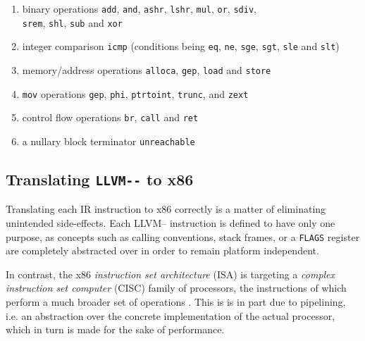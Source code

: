 \documentclass{article}
\begin{document}

\label{appendix:llvmis}
\begin{enumerate}
    \item binary operations \lstinline!add!, \lstinline!and!, \lstinline!ashr!, \lstinline!lshr!, \lstinline!mul!, \lstinline!or!, \lstinline!sdiv!,\\\lstinline!srem!, \lstinline!shl!, \lstinline!sub! and \lstinline!xor!
    \item integer comparison \lstinline!icmp! (conditions being \lstinline!eq!, \lstinline!ne!, \lstinline!sge!, \lstinline!sgt!, \lstinline!sle! and \lstinline!slt!)
    \item memory/address operations \lstinline!alloca!, \lstinline!gep!, \lstinline!load! and \lstinline!store!
    \item  \lstinline!mov! operations \lstinline!gep!, \lstinline!phi!, \lstinline!ptrtoint!, \lstinline!trunc!, and \lstinline!zext!
    \item control flow operations \lstinline!br!, \lstinline!call! and \lstinline!ret!
    \item a  nullary block terminator \lstinline!unreachable!
\end{enumerate}

\subsection{Translating \lstinline!LLVM--! to x86}

Translating each IR instruction to x86 correctly is a matter of eliminating unintended side-effects. Each LLVM-- instruction is defined to have only one purpose, %
as concepts such as calling conventions, stack frames, or a \lstinline!FLAGS! register are completely abstracted over in order to remain platform independent.

In contrast, the x86 \textit{instruction set architecture} (ISA) is targeting a  \textit{complex instruction set computer} (CISC) family of processors, the instructions of which perform a much broader set of operations \cite[p.~190]{tiger}. This is is in part due to pipelining, i.e. an abstraction over the concrete implementation of the actual processor, which in turn is made for the sake of performance.
\end{document}

